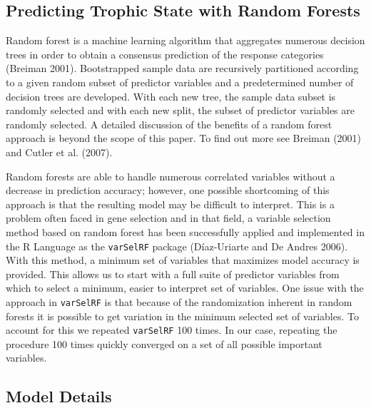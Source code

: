 \documentclass[11pt,]{article}
\begin{document}
\subsection{Predicting Trophic State with Random
Forests}\label{predicting-trophic-state-with-random-forests}

Random forest is a machine learning algorithm that aggregates numerous
decision trees in order to obtain a consensus prediction of the response
categories (Breiman 2001). Bootstrapped sample data are recursively
partitioned according to a given random subset of predictor variables
and a predetermined number of decision trees are developed. With each
new tree, the sample data subset is randomly selected and with each new
split, the subset of predictor variables are randomly selected. A
detailed discussion of the benefits of a random forest approach is
beyond the scope of this paper. To find out more see Breiman (2001) and
Cutler et al. (2007).

Random forests are able to handle numerous correlated variables without
a decrease in prediction accuracy; however, one possible shortcoming of
this approach is that the resulting model may be difficult to interpret.
This is a problem often faced in gene selection and in that field, a
variable selection method based on random forest has been successfully
applied and implemented in the R Language as the \texttt{varSelRF}
package (D{í}az-Uriarte and De Andres 2006). With this method, a minimum
set of variables that maximizes model accuracy is provided. This allows
us to start with a full suite of predictor variables from which to
select a minimum, easier to interpret set of variables. One issue with
the approach in \texttt{varSelRF} is that because of the randomization
inherent in random forests it is possible to get variation in the
minimum selected set of variables. To account for this we repeated
\texttt{varSelRF} 100 times. In our case, repeating the procedure 100
times quickly converged on a set of all possible important variables.

\subsection{Model Details}\label{model-details}
\end{document}

